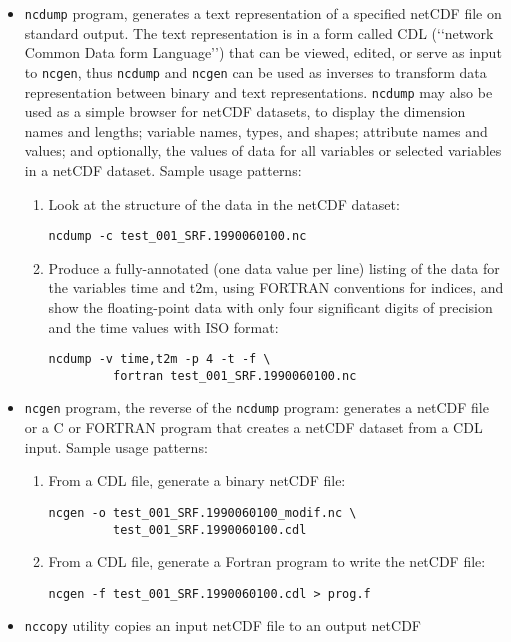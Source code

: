 \begin{itemize}
\item \verb=ncdump= program, generates a text representation of a specified
netCDF file on standard output. The text representation is in a form called
CDL (‘‘network Common Data form Language’’) that can be viewed, edited, or
serve as input to \verb=ncgen=, thus \verb=ncdump= and \verb=ncgen= can be
used as inverses to transform data representation between binary and text
representations. \verb=ncdump= may also be used as a simple browser for netCDF
datasets, to display the dimension names and lengths; variable names, types,
and shapes; attribute names and values; and optionally, the values of data
for all variables or selected variables in a netCDF dataset. 
Sample usage patterns:
\begin{enumerate}
\item Look at the structure of the data in the netCDF dataset:
\begin{Verbatim}
ncdump -c test_001_SRF.1990060100.nc
\end{Verbatim}
\item Produce a fully-annotated (one data value per line) listing of the data
for the variables time and t2m, using FORTRAN conventions for indices, and show
the floating-point data with only four significant digits of precision and the
time values with ISO format:
\begin{Verbatim}
ncdump -v time,t2m -p 4 -t -f \
         fortran test_001_SRF.1990060100.nc
\end{Verbatim}
\end{enumerate}
\item \verb=ncgen= program, the reverse of the \verb=ncdump= program: generates
a netCDF file or a C or FORTRAN program that creates a netCDF dataset from a
CDL input.
Sample usage patterns:
\begin{enumerate}
\item From a CDL file, generate a binary netCDF file:
\begin{Verbatim}
ncgen -o test_001_SRF.1990060100_modif.nc \
         test_001_SRF.1990060100.cdl
\end{Verbatim}
\item From a CDL file, generate a Fortran program to write the netCDF file:
\begin{Verbatim}
ncgen -f test_001_SRF.1990060100.cdl > prog.f
\end{Verbatim}
\end{enumerate}
\item \verb=nccopy= utility copies an input netCDF file to an output netCDF

\end{itemize}

